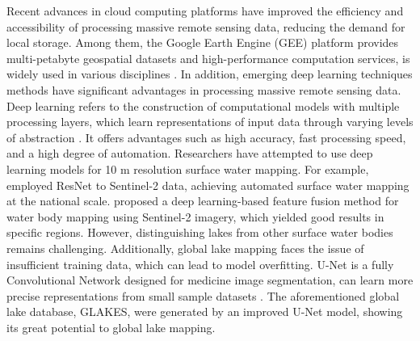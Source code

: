\documentclass[preprint,12pt,authoryear]{elsarticle}
\begin{document}
Recent advances in cloud computing platforms have improved the efficiency and accessibility of processing massive remote sensing data, reducing the demand for local storage. Among them, the Google Earth Engine (GEE) platform provides multi-petabyte geospatial datasets and high-performance computation services, is widely used in various disciplines \citep{gorelick_google_2017}. In addition, emerging deep learning techniques methods have significant advantages in processing massive remote sensing data. Deep learning refers to the construction of computational models with multiple processing layers, which learn representations of input data through varying levels of abstraction \citep{lecun_deep_2015}. It offers advantages such as high accuracy, fast processing speed, and a high degree of automation. Researchers have attempted to use deep learning models for 10 m resolution surface water mapping. For example, \citet{li_automatic_2021} employed ResNet to Sentinel-2 data, achieving automated surface water mapping at the national scale. \citet{manocha_mapping_2023} proposed a deep learning-based feature fusion method for water body mapping using Sentinel-2 imagery, which yielded good results in specific regions. However, distinguishing lakes from other surface water bodies remains challenging. Additionally, global lake mapping faces the issue of insufficient training data, which can lead to model overfitting. U-Net \citep{ronneberger_u-net_2015} is a fully Convolutional Network designed for medicine image segmentation, can learn more precise representations from small sample datasets \citep{siddique_u-net_2021}. The aforementioned global lake database, GLAKES, were generated by an improved U-Net model, showing its great potential to global lake mapping. 
\end{document}
